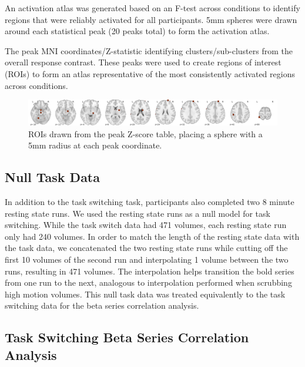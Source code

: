 \documentclass[10pt,letterpaper]{article}
\begin{document}
An activation atlas was generated based on an F-test across conditions
to identify regions that were reliably activated for all participants.
5mm spheres were drawn around each statistical peak (20 peaks total)
to form the activation atlas.

\begin{table}
  \caption{
    The peak MNI coordinates/Z-statistic identifying clusters/sub-clusters from the overall
    response contrast.
    These peaks were used to create regions of interest (ROIs) to form an atlas representative
    of the most consistently activated regions across conditions.
  }
  \label{table:clusters}
\end{table}


\begin{figure}[H]
  \centering
  \includegraphics[width=\textwidth]{activation_roi_map}
  \caption{
    ROIs drawn from the peak Z-score table, placing a sphere with a 5mm radius
    at each peak coordinate.
  }
  \label{fig:methroimap}
\end{figure}

\subsection*{Null Task Data}

In addition to the task switching task, participants also completed
two 8 minute resting state runs.
We used the resting state runs as a null model for task switching.
While the task switch data had 471 volumes, each resting state run only had
240 volumes.
In order to match the length of the resting state data with the task data, we concatenated
the two resting state runs while cutting off the first 10 volumes of the second run
and interpolating 1 volume between the two runs, resulting in 471 volumes.
The interpolation helps transition the bold series from one run to the next,
analogous to interpolation performed when scrubbing high motion volumes. 
This null task data was treated equivalently to the task switching data for the
beta series correlation analysis.

\subsection*{Task Switching Beta Series Correlation Analysis}
\end{document}
